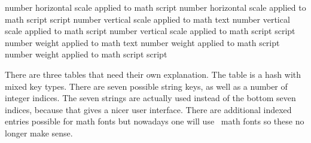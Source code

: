 \NC {}       \NC number  \NC horizontal scale applied to math script        \NC \NR
\NC {} \NC number  \NC horizontal scale applied to math script script \NC \NR
\HL
\NC {}         \NC number  \NC vertical scale applied to math text          \NC \NR
\NC {}       \NC number  \NC vertical scale applied to math script        \NC \NR
\NC {} \NC number  \NC vertical scale applied to math script script \NC \NR
\HL
\NC {}         \NC number  \NC weight  applied to math text          \NC \NR
\NC {}       \NC number  \NC weight  applied to math script        \NC \NR
\NC {} \NC number  \NC weight  applied to math script script \NC \NR
\LL
\stoptabulate

%
%
%

There are three tables that need their own explanation. The 
table is a hash with mixed key types. There are seven possible string keys, as
well as a number of integer indices. The seven strings are actually used instead
of the bottom seven indices, because that gives a nicer user interface. There are
additional indexed entries possible for math fonts but nowadays one will use
\OPENTYPE\ math fonts so these no longer make sense.

